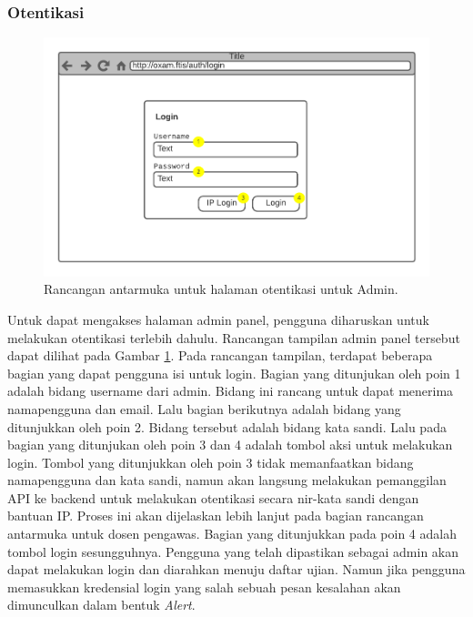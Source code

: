 \subsubsection{Otentikasi}
    \begin{figure}
        \centering
        \includegraphics[width=0.7\paperwidth]{Gambar/mockups/Mockup--Admin - Login.pdf}
        \caption{Rancangan antarmuka untuk halaman otentikasi untuk Admin.}
        \label{fig:mockup_admin_login}
    \end{figure}
    Untuk dapat mengakses halaman admin panel, pengguna diharuskan untuk
    melakukan otentikasi terlebih dahulu. Rancangan tampilan admin panel
    tersebut dapat dilihat pada Gambar \ref{fig:mockup_admin_login}. Pada
    rancangan tampilan, terdapat beberapa bagian yang dapat pengguna isi untuk
    login. Bagian yang ditunjukan oleh poin 1 adalah bidang username dari admin.
    Bidang ini rancang untuk dapat menerima namapengguna dan email. Lalu
    bagian berikutnya adalah bidang yang ditunjukkan oleh poin 2. Bidang
    tersebut adalah bidang kata sandi. Lalu pada bagian yang ditunjukan oleh
    poin 3 dan 4 adalah tombol aksi untuk melakukan login. Tombol yang
    ditunjukkan oleh poin 3 tidak memanfaatkan bidang namapengguna dan kata
    sandi, namun akan langsung melakukan pemanggilan API ke backend untuk
    melakukan otentikasi secara nir-kata sandi dengan bantuan IP. Proses ini
    akan dijelaskan lebih lanjut pada bagian rancangan antarmuka untuk dosen
    pengawas. Bagian yang ditunjukkan pada poin 4 adalah tombol login
    sesungguhnya. Pengguna yang telah dipastikan sebagai admin akan dapat
    melakukan login dan diarahkan menuju daftar ujian. Namun jika pengguna
    memasukkan kredensial login yang salah sebuah pesan kesalahan akan
    dimunculkan dalam bentuk \textit{Alert}.
    
